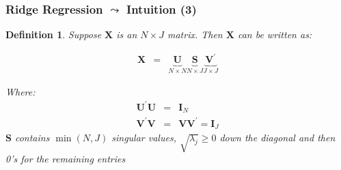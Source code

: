 \documentclass{beamer}
\newtheorem{defn}{Definition}
\numberwithin{equation}{section}
\begin{document}
\begin{frame}
\frametitle{Ridge Regression $\leadsto$ Intuition (3) }

\begin{defn}
Suppose $\boldsymbol{X}$ is an $N \times J$ matrix.  Then $\boldsymbol{X}$ can be written as:

\begin{eqnarray}
\boldsymbol{X} & =& \underbrace{\boldsymbol{U}}_{N \times N} \underbrace{\boldsymbol{S}}_{N \times J} \underbrace{\boldsymbol{V}^{'}}_{J \times J} \nonumber
\end{eqnarray}

Where:
\begin{eqnarray}
\boldsymbol{U}^{'}\boldsymbol{U} & = & \boldsymbol{I}_{N} \nonumber \\
\boldsymbol{V}^{'}\boldsymbol{V} & = & \boldsymbol{V}\boldsymbol{V}^{'} = \boldsymbol{I}_{J} \nonumber
\end{eqnarray}
$\boldsymbol{S}$ contains $\min(N, J)$ singular values, $\sqrt{\lambda_{j}}\geq 0$ down the diagonal and then 0's for the remaining entries
\end{defn}


\end{frame}
\end{document}
